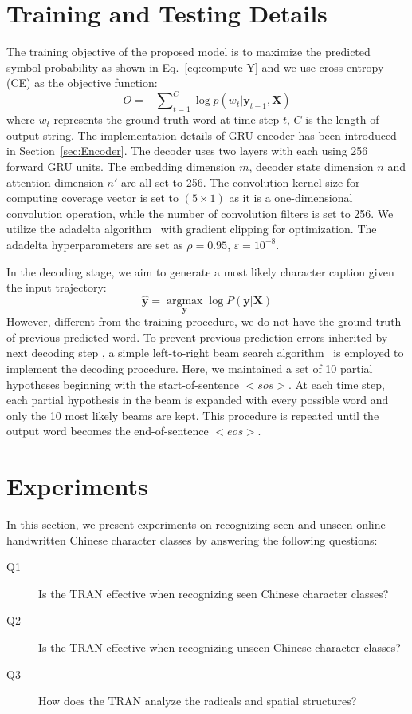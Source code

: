 \documentclass[a4paper,conference]{IEEEtran}
\begin{document}
\section{Training and Testing Details}
\label{sec:Training and Testing Details}

The training objective of the proposed model is to maximize the predicted symbol probability as shown in Eq.~\eqref{eq:compute Y} and we use cross-entropy (CE) as the objective function:
\begin{equation}\label{eq:objective}
  O = - \sum\nolimits_{t=1}^C \log p({w_t}|{\mathbf{y}_{t-1},\mathbf{X}})
\end{equation}
where $w_t$ represents the ground truth word at time step $t$, $C$ is the length of output string. The implementation details of GRU encoder has been introduced in Section~\ref{sec:Encoder}. The decoder uses two layers with each using 256 forward GRU units. The embedding dimension $m$, decoder state dimension $n$ and attention dimension $n'$ are all set to 256. The convolution kernel size for computing coverage vector is set to $(5 \times 1)$ as it is a one-dimensional convolution operation, while the number of convolution filters is set to 256. We utilize the adadelta algorithm~\cite{zeiler2012adadelta} with gradient clipping for optimization. The adadelta hyperparameters are set as $\rho = 0.95$, $\varepsilon = {10^{ - 8}}$.

In the decoding stage, we aim to generate a most likely character caption given the input trajectory:
\begin{equation}\label{eq:decoding objective}
  {\mathbf{\hat y}} = \mathop {\arg \max }\limits_{\mathbf{y}} \log P\left( {{\mathbf{y}}|{\mathbf{X}}} \right)
\end{equation}
However, different from the training procedure, we do not have the ground truth of previous predicted word. To prevent previous prediction errors inherited by next decoding step , a simple left-to-right beam search algorithm~\cite{cho2015natural} is employed to implement the decoding procedure. Here, we maintained a set of 10 partial hypotheses beginning with the start-of-sentence $<sos>$. At each time step, each partial hypothesis in the beam is expanded with every possible word and only the 10 most likely beams are kept. This procedure is repeated until the output word becomes the end-of-sentence $<eos>$.



\section{Experiments}
\label{sec:Experiments}
In this section, we present experiments on recognizing seen and unseen online handwritten Chinese character classes by answering the following questions:
\begin{description}
    \item[Q1] Is the TRAN effective when recognizing seen Chinese character classes?
    \item[Q2] Is the TRAN effective when recognizing unseen Chinese character classes?
    \item[Q3] How does the TRAN analyze the radicals and spatial structures?
\end{description}
\end{document}
